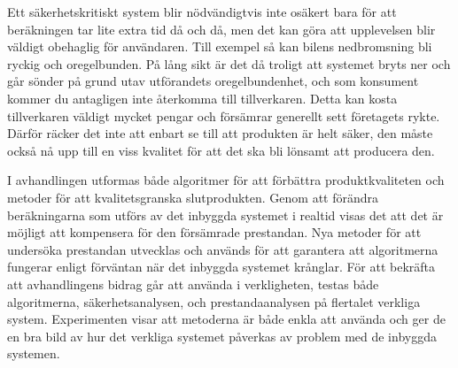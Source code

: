 \documentclass[svenska]{style/LTHthesis}
\begin{document}
Ett säkerhetskritiskt system blir nödvändigtvis inte osäkert bara för att beräkningen tar lite extra tid då och då, men det kan göra att upplevelsen blir väldigt obehaglig för användaren.
Till exempel så kan bilens nedbromsning bli ryckig och oregelbunden.
På lång sikt är det då troligt att systemet bryts ner och går sönder på grund utav utförandets oregelbundenhet, och som konsument kommer du antagligen inte återkomma till tillverkaren.
Detta kan kosta tillverkaren väldigt mycket pengar och försämrar generellt sett företagets rykte.
Därför räcker det inte att enbart se till att produkten är helt säker, den måste också nå upp till en viss kvalitet för att det ska bli lönsamt att producera den.

I avhandlingen utformas både algoritmer för att förbättra produktkvaliteten och metoder för att kvalitetsgranska slutprodukten.
Genom att förändra beräkningarna som utförs av det inbyggda systemet i realtid visas det att det är möjligt att kompensera för den försämrade prestandan.
Nya metoder för att undersöka prestandan utvecklas och används för att garantera att algoritmerna fungerar enligt förväntan när det inbyggda systemet krånglar.
För att bekräfta att avhandlingens bidrag går att använda i verkligheten, testas både algoritmerna, säkerhetsanalysen, och prestandaanalysen på flertalet verkliga system.
Experimenten visar att metoderna är både enkla att använda och ger de en bra bild av hur det verkliga systemet påverkas av problem med de inbyggda systemen.
\end{document}
